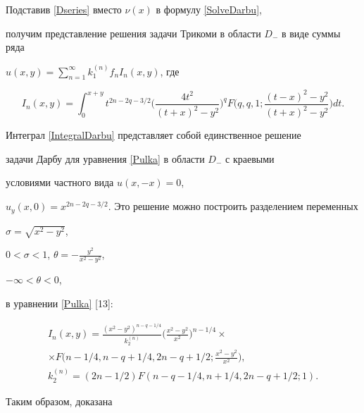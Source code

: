 Подставив \eqref{Dseries} вместо $\nu(x)$ в формулу \eqref{SolveDarbu}, 


получим представление решения задачи Трикоми в области $D_-$ в виде суммы ряда


$u(x,y)=\sum\limits_{n=1}^\infty k_{1}^{(n)}f_nI_n(x,y)$, где


\begin{equation}\label{IntegralDarbu}


I_n(x,y)= \int_0^{x+y} t^{2n-2q-3/2}\bigg( \frac{4t^2}{(t+x)^2-y^2}\bigg)^{q}


F\bigg(q,q,1;\frac{(t-x)^2-y^2 }{(t+x)^2-y^2}\bigg)dt.


\end{equation}





Интеграл \eqref{IntegralDarbu} представляет собой единственное решение 


задачи Дарбу для уравнения \eqref{Pulka} в области $D_-$ с краевыми 


условиями частного вида $u(x,-x)=0$,


$u_y(x,0)=x^{2n-2q-3/2}$. Это решение можно построить разделением переменных


$\sigma=\sqrt{x^2-y^2}$,


$0<\sigma<1$, $\theta=-\frac{y^2}{x^2-y^2}$,


$-\infty<\theta<0$,


в уравнении \eqref{Pulka} [13]:


\begin{gather*}


I_n(x,y)=\frac{(x^2-y^2)^{n-q-1/4}}{k_{2}^{(n)}}


\bigg(\frac{x^2-y^2}{x^2}\bigg)^{n-1/4}\times \\


%


\times F\bigg({n-1/4},{n-q+1/4},{2n-q+1/2};\frac{x^2-y^2}{x^2}\bigg),\\


%


k_{2}^{(n)} = (2n-1/2)F({n-q-1/4},{n+1/4},{2n-q+1/2};{1}).


\end{gather*}





Таким образом, доказана





